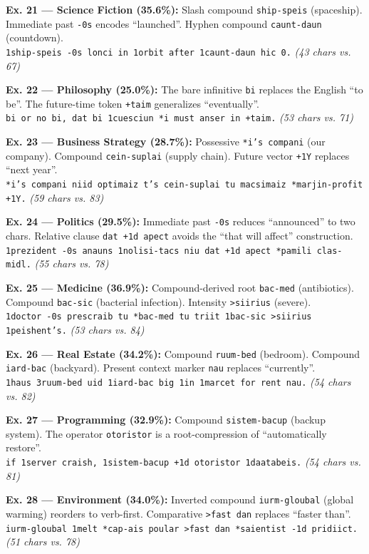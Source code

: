 \documentclass[10pt,twocolumn,letterpaper]{article}
\newcommand{\me}[1]{\texttt{#1}}
\begin{document}
\textbf{Ex. 21 --- Science Fiction (35.6\%):} Slash compound \me{ship-speis} (spaceship). Immediate past \me{-0s} encodes ``launched''. Hyphen compound \me{caunt-daun} (countdown).\\
\me{1ship-speis -0s lonci in 1orbit after 1caunt-daun hic 0.} \textit{(43 chars vs. 67)}

\textbf{Ex. 22 --- Philosophy (25.0\%):} The bare infinitive \me{bi} replaces the English ``to be''. The future-time token \me{+taim} generalizes ``eventually''.\\
\me{bi or no bi, dat bi 1cuesciun *i must anser in +taim.} \textit{(53 chars vs. 71)}

\textbf{Ex. 23 --- Business Strategy (28.7\%):} Possessive \me{*i's compani} (our company). Compound \me{cein-suplai} (supply chain). Future vector \me{+1Y} replaces ``next year''.\\
\me{*i's compani niid optimaiz t's cein-suplai tu macsimaiz *marjin-profit +1Y.} \textit{(59 chars vs. 83)}

\textbf{Ex. 24 --- Politics (29.5\%):} Immediate past \me{-0s} reduces ``announced'' to two chars. Relative clause \me{dat +1d apect} avoids the ``that will affect'' construction.\\
\me{1prezident -0s anauns 1nolisi-tacs niu dat +1d apect *pamili clas-midl.} \textit{(55 chars vs. 78)}

\textbf{Ex. 25 --- Medicine (36.9\%):} Compound-derived root \me{bac-med} (antibiotics). Compound \me{bac-sic} (bacterial infection). Intensity \me{>siirius} (severe).\\
\me{1doctor -0s prescraib tu *bac-med tu triit 1bac-sic >siirius 1peishent's.} \textit{(53 chars vs. 84)}

\textbf{Ex. 26 --- Real Estate (34.2\%):} Compound \me{ruum-bed} (bedroom). Compound \me{iard-bac} (backyard). Present context marker \me{nau} replaces ``currently''.\\
\me{1haus 3ruum-bed uid 1iard-bac big 1in 1marcet for rent nau.} \textit{(54 chars vs. 82)}

\textbf{Ex. 27 --- Programming (32.9\%):} Compound \me{sistem-bacup} (backup system). The operator \me{otoristor} is a root-compression of ``automatically restore''.\\
\me{if 1server craish, 1sistem-bacup +1d otoristor 1daatabeis.} \textit{(54 chars vs. 81)}

\textbf{Ex. 28 --- Environment (34.0\%):} Inverted compound \me{iurm-gloubal} (global warming) reorders to verb-first. Comparative \me{>fast dan} replaces ``faster than''.\\
\me{iurm-gloubal 1melt *cap-ais poular >fast dan *saientist -1d pridiict.} \textit{(51 chars vs. 78)}
\end{document}
